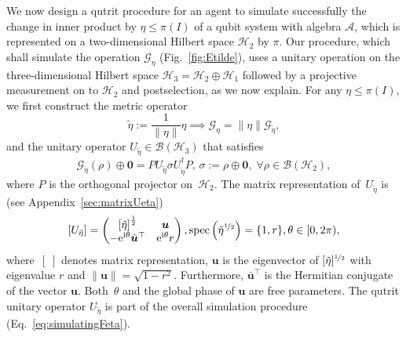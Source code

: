 \documentclass[amsmath,amssymb,aps,pra,superscriptaddress,twocolumn]{revtex4-2}
\begin{document}
We now design a qutrit procedure for an agent to simulate successfully the change in inner product by $\eta \le \pi(I)$ 
of a qubit system with algebra $\mathcal{A}$, which is represented on a 
two-dimensional Hilbert space $\mathscr{H}_2$ by $\pi$.
Our procedure, which shall simulate the operation $\mathcal{G}_\eta$ (Fig.~\ref{fig:Etilde}),
uses a unitary operation on the three-dimensional Hilbert space $\mathscr{H}_3=\mathscr{H}_2 \oplus \mathscr{H}_1$ 
followed by a projective measurement on to $\mathscr{H}_2$ and postselection, as we now explain.
For any $\eta \le \pi(I)$, we first construct the metric operator
\begin{equation}
\label{eq:tildeeta}
\tilde{\eta}:=\frac{1}{\|\eta\|}\eta
\implies\mathcal{G}_\eta = \|\eta\|\mathcal{G}_{\tilde{\eta}},
\end{equation}
and the unitary operator $U_{\tilde{\eta}}\in \mathcal{B}(\mathscr{H}_3)$ that satisfies
\begin{equation}
\label{eq:simulatingFeta}
    \mathcal{G}_{\tilde{\eta}}(\rho)\oplus \bm{0} = PU_{\tilde{\eta}}\sigma U_{\tilde{\eta}}^\dagger P,\, \sigma:=\rho\oplus \bm{0},
    \;\forall \rho\in \mathcal{B}(\mathscr{H}_2),
\end{equation}
where $P$ is the orthogonal projector on~$\mathscr{H}_2$. 
The matrix representation of~$U_{\tilde{\eta}}$ is (see Appendix~\ref{sec:matrixUeta})
\begin{equation}
\label{eq:Ueta}
    \left[U_{\tilde{\eta}}\right]
    = \begin{pmatrix}
    \left[\tilde{\eta}\right]^{\frac12} &\bm{u} \\ -\text{e}^{\text{i} \theta}\bar{\bm{u}}^{\top} &\text{e}^{\text{i}\theta}r 
    \end{pmatrix},
    \text{spec}\left(\tilde{\eta}^{\nicefrac12}\right)=\{1,r\},
    \theta\in [0,2\pi),
\end{equation}
where~$[\;]$ denotes matrix representation,
$\bm{u}$ is the eigenvector of $[\tilde{\eta}]^{\nicefrac12}$ with eigenvalue $r$
and $\| \bm{u}\| = \sqrt{1-r^2}$.
Furthermore,
$\bar{\bm{u}}^{\top}$ is the Hermitian conjugate of the vector $\bm{u}$.
Both~$\theta$ and the global phase of $\bm{u}$ are free parameters.
The qutrit unitary operator $U_{\tilde{\eta}}$ is part of the overall 
simulation procedure (Eq.~\eqref{eq:simulatingFeta}).
\end{document}
